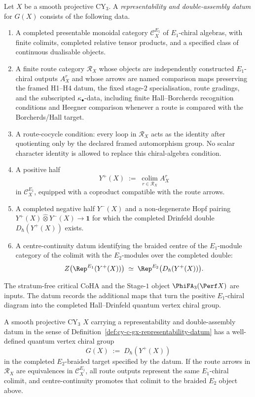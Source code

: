 \begin{definition}
\label{def:cy-c-gx-representability-datum}
Let $X$ be a smooth projective CY$_3$. A
\emph{representability and double-assembly datum} for $G(X)$ consists
of the following data.
\begin{enumerate}[label=\textup{(H\arabic*)}, leftmargin=2.5em]
\item A completed presentable monoidal category
$\mathcal{C}^{E_1}_X$ of $E_1$-chiral algebras, with finite colimits,
completed relative tensor products, and a specified class of continuous
dualisable objects.
\item A finite route category $\mathcal{R}_X$ whose objects are
independently constructed $E_1$-chiral outputs $A_X^r$ and whose arrows
are named comparison maps preserving the framed H1--H4 datum, the fixed
stage-$2$ specialisation, route gradings, and the subscripted
$\kappa_\bullet$-data, including finite Hall--Borcherds recognition conditions
and Heegner comparison whenever a route is compared with the
Borcherds/Hall target.
\item A route-cocycle condition: every loop in $\mathcal{R}_X$ acts as
the identity after quotienting only by the declared framed automorphism
group. No scalar character identity is allowed to replace this
chiral-algebra condition.
\item A positive half
\[
 Y^+(X) \;:=\; \operatorname*{colim}_{r\in\mathcal{R}_X} A_X^r
\]
in $\mathcal{C}^{E_1}_X$, equipped with a coproduct compatible with the
route arrows.
\item A completed negative half $Y^-(X)$ and a non-degenerate Hopf
pairing $Y^+(X)\widehat\otimes Y^-(X)\to\mathbf{1}$ for which the
completed Drinfeld double $D_\hbar(Y^+(X))$ exists.
\item A centre-continuity datum identifying the braided centre of the
$E_1$-module category of the colimit with the $E_2$-modules over the
completed double:
\[
 Z\bigl(\Rep^{E_1}(Y^+(X))\bigr)
 \;\simeq\;
 \Rep^{E_2}\bigl(D_\hbar(Y^+(X))\bigr).
\]
\end{enumerate}
The stratum-free critical CoHA and the Stage-$1$ object
$\PhiFA_3(\Perf X)$ are inputs. The datum records the additional
maps that turn the positive $E_1$-chiral diagram into the completed
Hall--Drinfeld quantum vertex chiral group.
\end{definition}

\begin{theorem}
\label{thm:cy-c-gx-representability-criterion}
A smooth projective CY$_3$ $X$ carrying a representability and
double-assembly datum in the sense of
Definition~\ref{def:cy-c-gx-representability-datum} has a well-defined
quantum vertex chiral group
\[
 G(X) \;:=\; D_\hbar(Y^+(X))
\]
in the completed $E_2$-braided target specified by the datum. If the route arrows in
$\mathcal{R}_X$ are equivalences in $\mathcal{C}^{E_1}_X$, all route
outputs represent the same $E_1$-chiral colimit, and centre-continuity
promotes that colimit to the braided $E_2$ object above.
\end{theorem}

